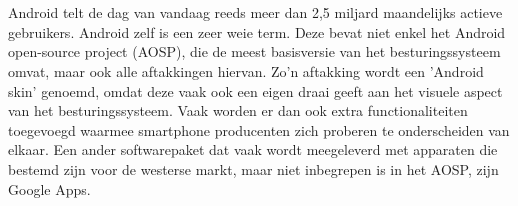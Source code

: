 
%
%

%



\chapter*{}

Android telt de dag van vandaag reeds meer dan 2,5 miljard maandelijks actieve gebruikers. Android zelf is een zeer weie term. Deze bevat niet enkel het Android open-source project (AOSP), die de meest basisversie van het besturingssysteem omvat, maar ook alle aftakkingen hiervan. Zo'n aftakking wordt een 'Android skin' genoemd, omdat deze vaak ook een eigen draai geeft aan het visuele aspect van het besturingssysteem. Vaak worden er dan ook extra functionaliteiten toegevoegd waarmee smartphone producenten zich proberen te onderscheiden van elkaar. Een ander softwarepaket dat vaak wordt meegeleverd met apparaten die bestemd zijn voor de westerse markt, maar niet inbegrepen is in het AOSP, zijn Google    Apps.

